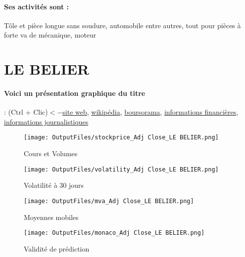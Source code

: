 \documentclass[11pt,a4paper]{report}%
\begin{document}
\paragraph{Ses activités sont : } Tôle et pièce longue sans soudure, automobile entre autres, tout pour pièces à forte va de mécanique, moteur 
    
    \newpage

\section{LE BELIER}

\paragraph{Voici un présentation graphique du titre} : (Ctrl + Clic)$<-$\href{https://www.lebelier.com/accueil/}{site web}, \href{https://fr.wikipedia.org/wiki/Le_B%C3%A9lier_(entreprise)}{wikipédia}, \href{https://www.boursorama.com/cours/1rPBELI}{boursorama}, \href{https://www.qwant.com/?q=site:https:%2f%2fwww.easybourse.com%2faction-societe%2fLE-BELIER&t=web&client=ext-firefox-hp}{informations financières}, \href{https://bourse.lerevenu.com/cours-de-bourse/fiche-valeur-synthese/LE-BELIER/BELI-FR}{informations journalistiques}
\begin{figure}[!htb]
   \begin{minipage}{0.5\textwidth}
     \centering
     \texttt{[image: OutputFiles/stockprice\_Adj Close\_LE BELIER.png]}
     \caption{Cours et Volumes}\label{Fig:price_LE BELIER}
   \end{minipage}\hfill
   \begin{minipage}{0.5\textwidth}
     \centering
     \texttt{[image: OutputFiles/volatility\_Adj Close\_LE BELIER.png]}
     \caption{Volatilité à 30 jours}\label{Fig:volat_LE BELIER}
   \end{minipage}
\end{figure}
\begin{figure}[!htb]
   \begin{minipage}{0.5\textwidth}
     \centering
     \texttt{[image: OutputFiles/mva\_Adj Close\_LE BELIER.png]}
     \caption{Moyennes mobiles}\label{Fig:mva_LE BELIER}
   \end{minipage}\hfill
   \begin{minipage}{0.5\textwidth}
     \centering
     \texttt{[image: OutputFiles/monaco\_Adj Close\_LE BELIER.png]}
     \caption{Validité de prédiction}\label{Fig:prediction_LE BELIER}
   \end{minipage}
\end{figure}
\end{document}
